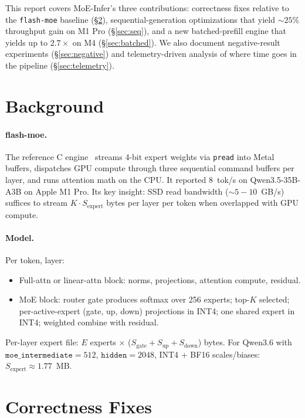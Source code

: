 \documentclass[11pt,a4paper]{article}
\begin{document}
This report covers MoE-Infer's three contributions: correctness fixes
relative to the \texttt{flash-moe} baseline (\S\ref{sec:correctness}),
sequential-generation optimizations that yield $\sim 25\%$ throughput
gain on M1 Pro (\S\ref{sec:seq}), and a new batched-prefill engine
that yields up to $2.7\times$ on M4 (\S\ref{sec:batched}). We also
document negative-result experiments
(\S\ref{sec:negative}) and telemetry-driven analysis of where time
goes in the pipeline (\S\ref{sec:telemetry}).

\section{Background}

\paragraph{flash-moe.} The reference C engine~\cite{flashmoe} streams
4-bit expert weights via \texttt{pread} into Metal buffers, dispatches
GPU compute through three sequential command buffers per layer, and
runs attention math on the CPU. It reported 8~tok/s on Qwen3.5-35B-A3B
on Apple M1 Pro. Its key insight: SSD read bandwidth ($\sim 5\!-\!10$~GB/s)
suffices to stream $K \cdot S_{\text{expert}}$ bytes per layer per
token when overlapped with GPU compute.

\paragraph{Model.} Per token, layer:
\begin{itemize}
\item Full-attn or linear-attn block: norms, projections, attention
    compute, residual.
\item MoE block: router gate produces softmax over 256 experts; top-$K$
    selected; per-active-expert (gate, up, down) projections in INT4;
    one shared expert in INT4; weighted combine with residual.
\end{itemize}
Per-layer expert file: $E$ experts $\times$ ($S_{\text{gate}} +
S_{\text{up}} + S_{\text{down}}$) bytes. For Qwen3.6 with
$\texttt{moe\_intermediate}{=}512$, $\texttt{hidden}{=}2048$, INT4 +
BF16 scales/biases: $S_{\text{expert}} \approx 1.77$~MB.

\section{Correctness Fixes}\label{sec:correctness}
\end{document}

